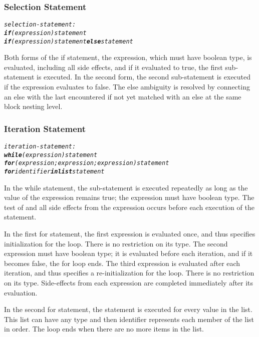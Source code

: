 \documentclass[12pt]{report}
\begin{document}
\subsubsection{Selection Statement}
\begin{alltt}
         \textit{selection-statement:}
              \textit{\textbf{if} (expression) statement}
              \textit{\textbf{if} (expression) statement \textbf{else} statement}
\end{alltt}
\begin{doublespace}
Both forms of the if statement, the expression, which must have boolean type, is evaluated, including all side effects, and if it evaluated to true, the first sub-statement is executed. In the second form, the second sub-statement is executed if the expression evaluates to false. The else ambiguity is resolved by connecting an else with the last encountered if not yet matched with an else at the same block nesting level.
\end{doublespace}

\subsubsection{Iteration Statement}
\begin{alltt}
         \textit{iteration-statement:}
              \textit{\textbf{while} (expression) statement}
              \textit{\textbf{for} (expression; expression; expression) statement}
              \textit{\textbf{for} identifier \textbf{in list} statement}
\end{alltt}
\begin{doublespace}
In the while statement, the sub-statement is executed repeatedly as long as the value of the expression remains true; the expression must have boolean type. The test of and all side effects from the expression occurs before each execution of the statement.

In the first for statement, the first expression is evaluated once, and thus specifies initialization for the loop. There is no restriction on its type. The second expression must have boolean type; it is evaluated before each iteration, and if it becomes false, the for loop ends. The third expression is evaluated after each iteration, and thus specifies a re-initialization for the loop. There is no restriction on its type. Side-effects from each expression are completed immediately after its evaluation.

In the second for statement, the statement is executed for every value in the list. This list can have any type and then identifier represents each member of the list in order. The loop ends when there are no more items in the list.
\end{doublespace}
\end{document}
